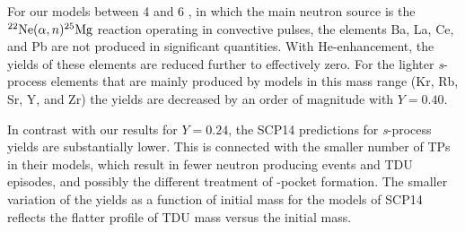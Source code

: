 For our models between 4 and 6 \Msun, in which the main neutron source is the $\mbox{${}^{22}{\text{Ne}}$}(\alpha,n)\mbox{${}^{25}{\text{Mg}}$}$ reaction operating in convective pulses, the elements Ba, La, Ce, and Pb are not produced in significant quantities. With He-enhancement, the yields of these elements are reduced further to effectively zero. For the lighter \textit{s}-process elements that are mainly produced by models in this mass range (Kr, Rb, Sr, Y, and Zr) the yields are decreased by an order of magnitude with $Y=0.40$.

In contrast with our results for $Y=0.24$, the SCP14 predictions for \textit{s}-process yields are substantially lower. This is connected with the smaller number of TPs in their models, which result in fewer neutron producing events and TDU episodes, and possibly the different treatment of -pocket formation. The smaller variation of the yields as a function of initial mass for the models of SCP14 reflects the flatter profile of TDU mass versus the initial mass.

